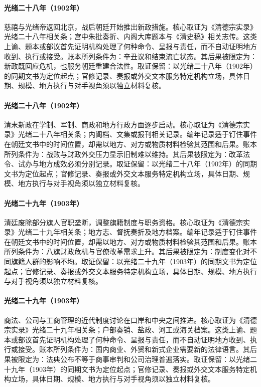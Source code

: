 \hypertarget{ledger:EQ-1902-CIXI-RETURN-BEIJING}{}\paragraph{光绪二十八年（1902年）}慈禧与光绪帝返回北京，战后朝廷开始推出新政措施。核心取证为《清德宗实录》光绪二十八年相关条；宫中朱批奏折、内阁大库题本与《清史稿》相关志传。这类上谕、题本或部议首先证明机构处理了何种命令、呈报与责任，而不自动证明地方收到、执行或接受。账本所列条件为：辛丑议和结束流亡状态。其后果被限定为：新政既回应危机，也服务朝廷重建合法性。取证保留：以光绪二十八年（1902年）的同期文书为定位起点；官修记录、奏报或外交文本服务特定机构立场，具体日期、规模、地方执行与对手视角须以独立材料复核。
\hypertarget{ledger:EQ-1902-NEW-POLICIES-EDUCATION}{}\paragraph{光绪二十八年（1902年）}清末新政在学制、军制、商政和地方行政方面逐步启动。核心取证为《清德宗实录》光绪二十八年相关条；内阁档、文集或报刊相关记录。编年记录适于钉住事件在朝廷文书中的时间位置，却需以地方、对方或物质材料检验其范围和后果。账本所列条件为：战败与财政外交压力显示旧制难以维持。其后果被限定为：改革法令、试办与地方成效必须分别记录。取证保留：以光绪二十八年（1902年）的同期文书为定位起点；官修记录、奏报或外交文本服务特定机构立场，具体日期、规模、地方执行与对手视角须以独立材料复核。
\hypertarget{ledger:EQ-1903-BANNER-POSTS-REFORM}{}\paragraph{光绪二十九年（1903年）}清廷废除部分旗人官职垄断，调整旗籍制度与职务资格。核心取证为《清德宗实录》光绪二十九年相关条；地方志、督抚奏折及地方档案。编年记录适于钉住事件在朝廷文书中的时间位置，却需以地方、对方或物质材料检验其范围和后果。账本所列条件为：八旗财政危机与官僚改革需求上升。其后果被限定为：制度变化对不同旗籍人群的影响不均。取证保留：以光绪二十九年（1903年）的同期文书为定位起点；官修记录、奏报或外交文本服务特定机构立场，具体日期、规模、地方执行与对手视角须以独立材料复核。
\hypertarget{ledger:EQ-1903-SHANGHAI-COMMERCIAL-LAW}{}\paragraph{光绪二十九年（1903年）}商法、公司与工商管理的近代制度讨论在口岸和中央之间推进。核心取证为《清德宗实录》光绪二十九年相关条；户部奏销、盐政、河工或海关档案。这类上谕、题本或部议首先证明机构处理了何种命令、呈报与责任，而不自动证明地方收到、执行或接受。账本所列条件为：国内商业、外贸和新式企业需要新的法律语言。其后果被限定为：法典公布不等于商事审判和公司治理普遍落实。取证保留：以光绪二十九年（1903年）的同期文书为定位起点；官修记录、奏报或外交文本服务特定机构立场，具体日期、规模、地方执行与对手视角须以独立材料复核。
